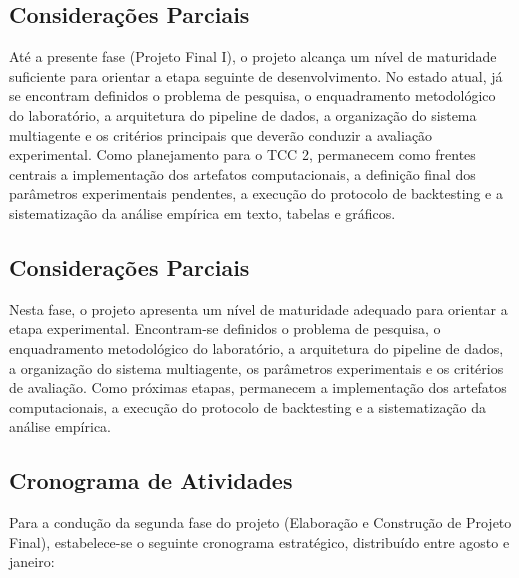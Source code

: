 \documentclass{eic-bcc-tcc}
\newcommand{\verify}[1]{{\color{blue} {#1}}}
\begin{document}
\subsection{Considerações Parciais}

\verify{Até a presente fase (Projeto Final I), o projeto alcança um nível de maturidade suficiente para orientar a etapa seguinte de desenvolvimento. No estado atual, já se encontram definidos o problema de pesquisa, o enquadramento metodológico do laboratório, a arquitetura do pipeline de dados, a organização do sistema multiagente e os critérios principais que deverão conduzir a avaliação experimental. Como planejamento para o TCC 2, permanecem como frentes centrais a implementação dos artefatos computacionais, a definição final dos parâmetros experimentais pendentes, a execução do protocolo de backtesting e a sistematização da análise empírica em texto, tabelas e gráficos.}

\subsection{Considerações Parciais}

Nesta fase, o projeto apresenta um nível de maturidade adequado para orientar a etapa experimental. Encontram-se definidos o problema de pesquisa, o enquadramento metodológico do laboratório, a arquitetura do pipeline de dados, a organização do sistema multiagente, os parâmetros experimentais e os critérios de avaliação. Como próximas etapas, permanecem a implementação dos artefatos computacionais, a execução do protocolo de backtesting e a sistematização da análise empírica.

\subsection{Cronograma de Atividades}

Para a condução da segunda fase do projeto (Elaboração e Construção de Projeto Final), estabelece-se o seguinte cronograma estratégico, distribuído entre agosto e janeiro:
\end{document}
